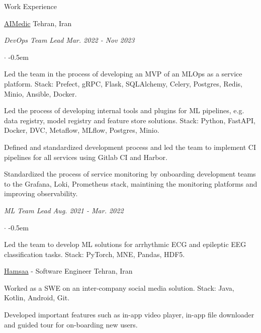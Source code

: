 \documentclass[../professional-cv.tex]{subfiles}
\begin{document}
\begin{rSection}{Work Experience}
	\begin{rWorkSection}
		{\href{https://aimedic.co/}{AIMedic}}
		{Tehran, Iran}

		\vspace{-1em}
		{\em DevOps Team Lead} \hfill {\em Mar. 2022 - Nov 2023} \hspace{10pt}
		\normalfont
		\begin{list}{$\cdot$}{\leftmargin=10pt\normalfont \rightmargin=20pt}
			\itemsep -0.5em
			\item Led the team in the process of developing an MVP of an MLOps as a service platform. Stack: Prefect, gRPC, Flask, SQLAlchemy, Celery, Postgres, Redis, Minio, Ansible, Docker.
			\item Led the process of developing internal tools and plugins for ML pipelines, e.g. data registry, model registry and feature store solutions. Stack: Python, FastAPI, Docker, DVC, Metaflow, MLflow, Postgres, Minio.
			\item Defined and standardized development process and led the team to implement CI pipelines for all services using Gitlab CI and Harbor.
			\item Standardized the process of service monitoring by onboarding development teams to the Grafana, Loki, Prometheus stack, maintining the monitoring platforms and improving observability.
		\end{list}
		{\em ML Team Lead} \hfill {\em Aug. 2021 - Mar. 2022}
		\normalfont
		\begin{list}{$\cdot$}{\leftmargin=10pt\normalfont \rightmargin=20pt}
			\itemsep -0.5em
			\item Led the team to develop ML solutions for arrhythmic ECG and epileptic EEG classification tasks. Stack: PyTorch, MNE, Pandas, HDF5.
		\end{list}
	\end{rWorkSection}

	\begin{rSubsection}
		{\href{https://hamsaa.ir}{Hamsaa}}
		{  -  }
		{Software Engineer}
		{Tehran, Iran}
		\item Worked as a SWE on an inter-company social media solution. Stack: Java, Kotlin, Android, Git.
		\item Developed important features such as in-app video player, in-app file downloader and guided tour for on-boarding new users.

	\end{rSubsection}



\end{rSection}
\end{document}
